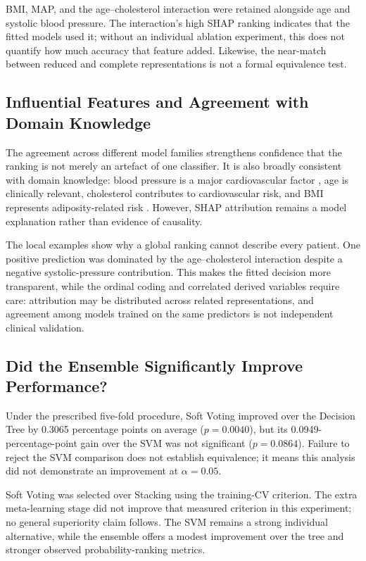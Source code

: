 \documentclass[11pt,a4paper]{article}
\begin{document}
BMI, MAP, and the age--cholesterol interaction were retained alongside age and systolic blood pressure. The interaction's high SHAP ranking indicates that the fitted models used it; without an individual ablation experiment, this does not quantify how much accuracy that feature added. Likewise, the near-match between reduced and complete representations is not a formal equivalence test.

\subsection{Influential Features and Agreement with Domain Knowledge}

The agreement across different model families strengthens confidence that the ranking is not merely an artefact of one classifier. It is also broadly consistent with domain knowledge: blood pressure is a major cardiovascular factor \cite{whelton2018}, age is clinically relevant, cholesterol contributes to cardiovascular risk, and BMI represents adiposity-related risk \cite{whoObesity2025}. However, SHAP attribution remains a model explanation rather than evidence of causality.



The local examples show why a global ranking cannot describe every patient. One positive prediction was dominated by the age--cholesterol interaction despite a negative systolic-pressure contribution. This makes the fitted decision more transparent, while the ordinal coding and correlated derived variables require care: attribution may be distributed across related representations, and agreement among models trained on the same predictors is not independent clinical validation.

\subsection{Did the Ensemble Significantly Improve Performance?}

Under the prescribed five-fold procedure, Soft Voting improved over the Decision Tree by 0.3065 percentage points on average ($p=0.0040$), but its 0.0949-percentage-point gain over the SVM was not significant ($p=0.0864$). Failure to reject the SVM comparison does not establish equivalence; it means this analysis did not demonstrate an improvement at $\alpha=0.05$.

Soft Voting was selected over Stacking using the training-CV criterion. The extra meta-learning stage did not improve that measured criterion in this experiment; no general superiority claim follows. The SVM remains a strong individual alternative, while the ensemble offers a modest improvement over the tree and stronger observed probability-ranking metrics.
\end{document}
